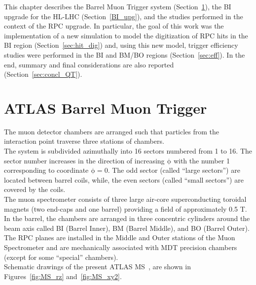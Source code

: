This chapter describes the Barrel Muon Trigger system (Section~\ref{barrel_muon_trig}), the BI upgrade for the HL-LHC (Section~\ref{BI_upg}), and the studies performed in the context of the RPC upgrade.
In particular, the goal of this work was the implementation of a new simulation to model the digitization of RPC hits in the BI region (Section~\ref{sec:hit_dig}) and, using this new model, trigger efficiency studies were performed in the BI and BM/BO regions (Section~\ref{sec:eff}).
In the end, summary and final considerations are also reported (Section~\ref{sec:concl_QT}).

\section{ATLAS Barrel Muon Trigger}
\label{barrel_muon_trig}
The muon detector chambers are arranged such that particles from the interaction point traverse three stations of chambers.\\
The system is subdivided azimuthally into 16 sectors numbered from 1 to 16.
The sector number increases in the direction of increasing $\mathrm{\phi}$ with the number 1 corresponding to coordinate $\mathrm{\phi=0}$. The odd sector (called “large sectors”)
are located between barrel coils, while, the even sectors (called “small sectors”) are covered by the coils.\\
The muon spectrometer consists of three large air-core superconducting toroidal magnets (two end-caps and one barrel) providing a field of approximately 0.5 T.\\
In the barrel, the chambers are arranged in three concentric cylinders around the beam axis called BI (Barrel Inner), BM (Barrel Middle), and BO (Barrel Outer). \\
The RPC planes are installed in the Middle
and Outer stations of the Muon Spectrometer and are mechanically associated with MDT precision chambers (except for some “special” chambers). \\
Schematic drawings of the present ATLAS MS~\cite{TDR}, are shown in Figures~\ref{fig:MS_rz} and~\ref{fig:MS_xy2}.

